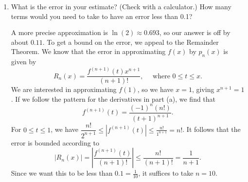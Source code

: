 \documentclass[12pt]{article}
\newcommand{\abs}[1]{\left\lvert #1\right\rvert}
\begin{document}
\begin{enumerate}
\begin{enumerate}
 \item What is the error in your estimate? (Check with a calculator.) How many terms would you need to take to have an error less than 0.1?

\medskip

 A more precise approximation is $\ln(2) \approx 0.693$, so our answer is off by about $0.11$. To get a bound on the error, we appeal to the Remainder Theorem. We know that the error in approximating $f(x)$ by $p_n(x)$ is given by
\[
 R_n(x) = \frac{f^{(n+1)}(t)x^{n+1}}{(n+1)!}, \quad \text{ where } 0\leq t\leq x.
\]
 We are interested in approximating $f(1)$, so we have $x=1$, giving $x^{n+1}=1$. If we follow the pattern for the derivatives in part (a), we find that
\[
 f^{(n+1)}(t) = \frac{(-1)^n(n!)}{(t+1)^{n+1}}.
\]
For $0\leq t\leq 1$, we have $\dfrac{n!}{2^{n+1}}\leq \abs{f^{(n+1)}(t)}\leq \frac{n!}{1^{n+1}} = n!$. It follows that the error is bounded according to
\[
 \abs{R_n(x)} = \abs{\frac{f^{(n+1)}(t)}{(n+1)!}} \leq \frac{n!}{(n+1)!} = \frac{1}{n+1}.
\]
Since we want this to be less than $0.1 = \frac{1}{10}$, it suffices to take $n=10$.
\end{enumerate}

\end{enumerate}
 
\end{document}

